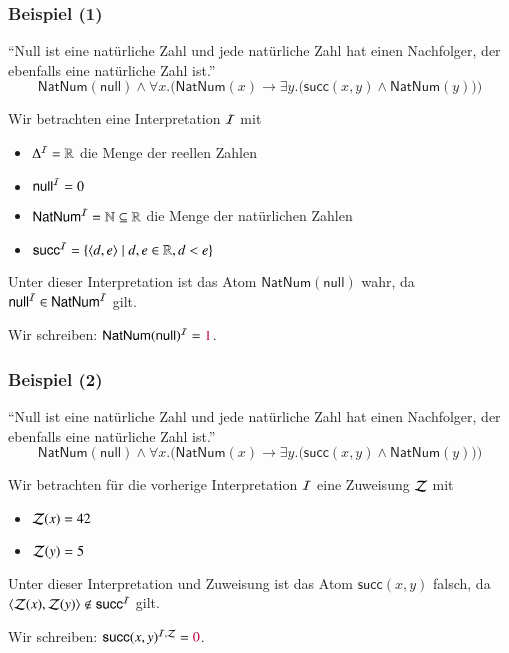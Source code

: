 \documentclass[aspectratio=1610,onlymath]{beamer}
\begin{document}
\begin{frame}[t]\frametitle{Beispiel (1)}

\alert{"`Null ist eine natürliche Zahl und jede natürliche Zahl hat einen Nachfolger, der
ebenfalls eine natürliche Zahl ist."'}
\[ \textsf{NatNum}(\textsf{null})\wedge \forall x.\Big(\textsf{NatNum}(x)\to\exists y.\big(\textsf{succ}(x,y)\wedge \textsf{NatNum}(y)\big)\Big)\]

Wir betrachten eine Interpretation $\mathcal{I}$ mit
\begin{itemize}
\item $\Delta^{\mathcal{I}}=\mathbb{R}$ die Menge der reellen Zahlen
\item $\textsf{null}^{\mathcal{I}}=0$
\item $\textsf{NatNum}^{\mathcal{I}}=\mathbb{N}\subseteq\mathbb{R}$ die Menge der natürlichen Zahlen
\item $\textsf{succ}^{\mathcal{I}}=\{\langle{d,e}\rangle\mid d,e\in\mathbb{R},d<e\}$
\end{itemize}

Unter dieser Interpretation ist das Atom $\textsf{NatNum}(\textsf{null})$ wahr, da
$\textsf{null}^{\mathcal{I}}\in\textsf{NatNum}^{\mathcal{I}}$ gilt.
\smallskip

Wir schreiben: $\textsf{NatNum}(\textsf{null})^{\mathcal{I}}=\textcolor{purple}{1}$.

\end{frame}

\begin{frame}[t]\frametitle{Beispiel (2)}

\alert{"`Null ist eine natürliche Zahl und jede natürliche Zahl hat einen Nachfolger, der
ebenfalls eine natürliche Zahl ist."'}
\[ \textsf{NatNum}(\textsf{null})\wedge \forall x.\Big(\textsf{NatNum}(x)\to\exists y.\big(\textsf{succ}(x,y)\wedge \textsf{NatNum}(y)\big)\Big)\]

Wir betrachten für die vorherige Interpretation $\mathcal{I}$ 
eine Zuweisung $\mathcal{Z}$ mit
\begin{itemize}
\item $\mathcal{Z}(x)=42$
\item $\mathcal{Z}(y)=5$
\end{itemize}

Unter dieser Interpretation und Zuweisung ist das Atom $\textsf{succ}(x,y)$ falsch, da
$\langle{\mathcal{Z}(x),\mathcal{Z}(y)}\rangle\notin\textsf{succ}^{\mathcal{I}}$ gilt.
\smallskip

Wir schreiben: $\textsf{succ}(x,y)^{\mathcal{I},\mathcal{Z}}=\textcolor{purple}{0}$.
\bigskip


\end{frame}
\end{document}
